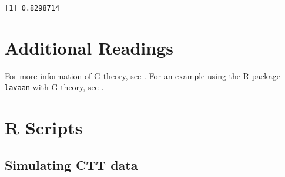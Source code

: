 \documentclass[
]{book}
\begin{document}
\begin{verbatim}
[1] 0.8298714
\end{verbatim}

\hypertarget{additional-readings}{%
\section{Additional Readings}\label{additional-readings}}

For more information of G theory, see \citet{raykov2011introduction}.
For an example using the R package \texttt{lavaan} with G theory, see \citet{Jorgensen2021Howestimateabsolute}.

\hypertarget{r-scripts}{%
\section{R Scripts}\label{r-scripts}}

\hypertarget{simulating-ctt-data}{%
\subsection{Simulating CTT data}\label{simulating-ctt-data}}
\end{document}
